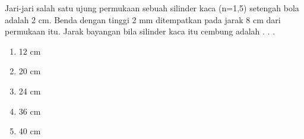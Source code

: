 \documentclass[11pt,a4paper]{extarticle}
\newcommand{\pilgani}[1]{                            \vspace{-0.3cm}\begin{multicols}{2}
 \begin{enumerate}[label=\Alph*., itemsep=0pt,topsep=0pt,leftmargin=*,align=Center]#1                     \end{enumerate}
 \phantom{ini cuma sapi, wedus, dan ayam}
 \end{multicols}}
\begin{document}
\begin{multicols*}{2}
\begin{enumerate}
Jari-jari salah satu ujung permukaan sebuah silinder kaca (n=1,5) setengah bola adalah 2 cm. Benda dengan tinggi 2 mm ditempatkan pada jarak 8 cm dari permukaan itu. Jarak bayangan bila silinder kaca itu cembung adalah . . .
\pilgani{
        \item 12 cm
        \item 20 cm
        \item 24 cm
        \item 36 cm
        \item 40 cm
        }

\end{enumerate}

\end{multicols*}
\end{document}
